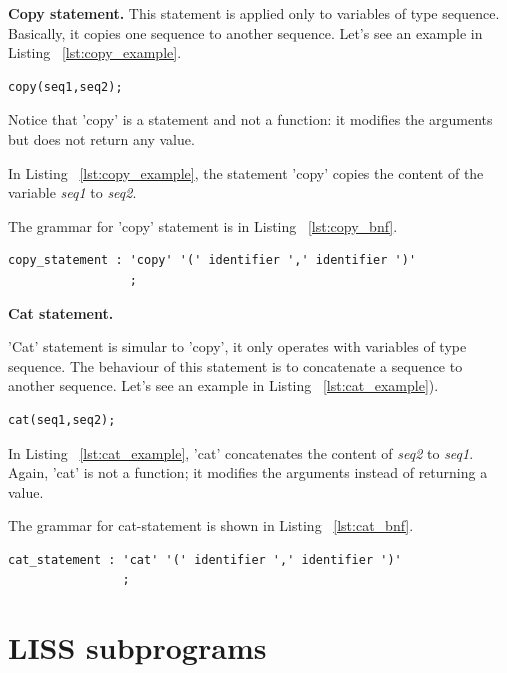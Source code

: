 \documentclass[
  oneside,
  11pt, a4paper,
  footinclude=true,
  headinclude=true,
  cleardoublepage=empty
]{scrbook}
\begin{document}
\textbf{Copy statement.}
This statement is applied only to variables of type sequence.
Basically, it copies one sequence to another sequence.
Let's see an example in Listing ~\ref{lst:copy_example}.

\begin{lstlisting}[caption={Example of copy statement in LISS},label={lst:copy_example}]
  copy(seq1,seq2);
\end{lstlisting}

Notice that 'copy' is a statement and not a function: it modifies the arguments but does not return any value.

In Listing ~\ref{lst:copy_example}, the statement 'copy' copies the content of the variable \textit{seq1} to \textit{seq2}.

The grammar for 'copy' statement is in Listing ~\ref{lst:copy_bnf}.

\begin{lstlisting}[caption={CFG for copy statement in LISS},label={lst:copy_bnf}]
  copy_statement : 'copy' '(' identifier ',' identifier ')'
                 ;
\end{lstlisting}

\textbf{Cat statement.}

'Cat' statement is simular to 'copy', it only operates with variables of type sequence.
The behaviour of this statement is to concatenate a sequence to another sequence.
Let's see an example in Listing ~\ref{lst:cat_example}).

\begin{lstlisting}[caption={Example of cat statement in LISS},label={lst:cat_example}]
  cat(seq1,seq2);
\end{lstlisting}

In Listing ~\ref{lst:cat_example}, 'cat' concatenates the content of \textit{seq2} to \textit{seq1}.
Again, 'cat' is not a function; it modifies the arguments instead of returning a value.

The grammar for cat-statement is shown in Listing ~\ref{lst:cat_bnf}.

\begin{lstlisting}[caption={CFG for cat statement in LISS},label={lst:cat_bnf}]
  cat_statement : 'cat' '(' identifier ',' identifier ')'
                ;
\end{lstlisting}

\section{LISS subprograms}
\label{sec:subprograms}
\end{document}
